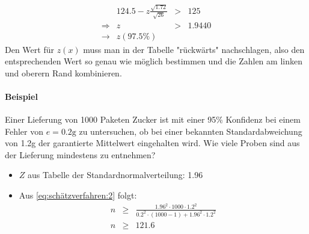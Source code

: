 \begin{equation*}
\begin{array}{rrcl}
&124.5-z\frac{\sqrt{1.72}}{\sqrt{26}}&>&125 \\
\Rightarrow&z&>&1.9440 \\
\rightarrow&z(97.5\%) && \
\end{array}
\end{equation*}
Den Wert für $z(x)$ muss man in der Tabelle "rückwärts" nachschlagen, also den entsprechenden Wert so genau wie möglich bestimmen und die Zahlen am linken und oberern Rand kombinieren.
\pagebreak
\paragraph{Beispiel} Einer Lieferung von 1000 Paketen Zucker ist mit einer 95\% Konfidenz bei einem Fehler von $e=0.2\text{g}$ zu untersuchen, ob bei einer bekannten Standardabweichung von 1.2g der garantierte Mittelwert eingehalten wird. Wie viele Proben sind aus der Lieferung mindestens zu entnehmen?
\begin{itemize}
\item $Z$ aus Tabelle der Standardnormalverteilung: 1.96
\item Aus \autoref{eq:schätzverfahren:2} folgt: 
\begin{equation*}
\begin{array}{rcl}
 n&\geq&\frac{1.96^2\cdot1000\cdot1.2^2}{0.2^2\cdot(1000-1)+1.96^2\cdot1.2^2}  \\
 n&\geq&121.6 
\end{array}
\end{equation*}
\end{itemize}